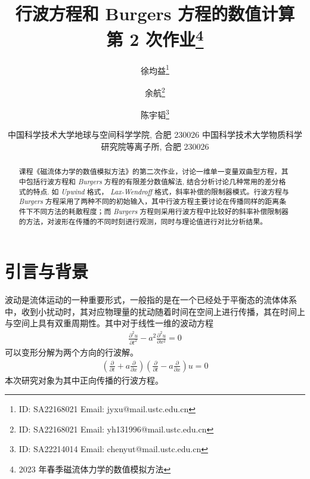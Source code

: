 \documentclass[10.5pt
]{article}
\def\Term{2023 年春季}
\def\Course{磁流体力学的数值模拟方法}
\begin{document}
\title{行波方程和 Burgers 方程的数值计算 \\
  第 2 次作业\footnote{\Term\Course}}

\author{徐均益\footnote{ID: SA22168021 Email: jyxu@mail.ustc.edu.cn}
  \and
  余航\footnote{ID: SA22168021 Email: yh131996@mail.ustc.edu.cn}
  \and
  陈宇韬\footnote{ID: SA22214014 Email: chenyut@mail.ustc.edu.cn}
}

\date{%
\scriptsize%
中国科学技术大学地球与空间科学学院, 合肥 230026
中国科学技术大学物质科学研究院等离子所, 合肥 230026
%
}


\maketitle

\begin{abstract}
课程《磁流体力学的数值模拟方法》的第二次作业，讨论一维单一变量双曲型方程，其中包括行波方程和 \textit{Burgers} 方程的有限差分数值解法,
结合分析讨论几种常用的差分格式的特点. 如 \textit{Upwind} 格式， \textit{Lax-Wendroff} 格式，斜率补偿的限制器模式。行波方程与 \textit{Burgers} 方程采用了两种不同的初始输入，其中行波方程主要讨论在传播同样的距离条件下不同方法的耗散程度；而 \textit{Burgers} 方程则采用行波方程中比较好的斜率补偿限制器的方法，对波形在传播的不同时刻进行观测，同时与理论值进行对比分析结果。
\end{abstract}

\section{引言与背景}
波动是流体运动的一种重要形式，一般指的是在一个已经处于平衡态的流体体系中，收到小扰动时，其对应物理量的扰动随着时间在空间上进行传播，其在时间上与空间上具有双重周期性。其中对于线性一维的波动方程
\begin{align}
\frac{\partial^2 u}{\partial t^2} - a^2 \frac{\partial^2 u}{\partial x^2} = 0
\label{EqnCon}
\end{align}
可以变形分解为两个方向的行波解。
\begin{align}
\left( \frac{\partial }{\partial t} + a \frac{\partial }{\partial x} \right) \left( \frac{\partial }{\partial t} - a \frac{\partial }{\partial x} \right) u= 0
\end{align}
本次研究对象为其中正向传播的行波方程。
\end{document}
